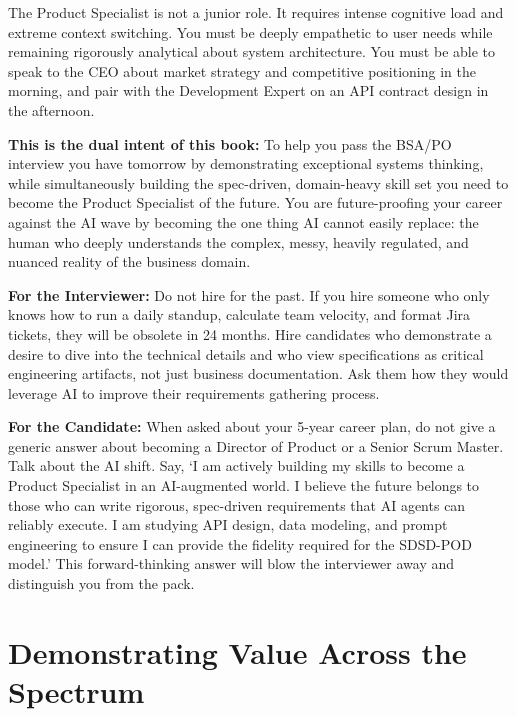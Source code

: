 \documentclass[
  11pt,
  openany,
  oneside]{book}
\renewenvironment{quote}{\begin{customquote}}{\end{customquote}}
\begin{document}
The Product Specialist is not a junior role. It requires intense
cognitive load and extreme context switching. You must be deeply
empathetic to user needs while remaining rigorously analytical about
system architecture. You must be able to speak to the CEO about market
strategy and competitive positioning in the morning, and pair with the
Development Expert on an API contract design in the afternoon.

\textbf{This is the dual intent of this book:} To help you pass the
BSA/PO interview you have tomorrow by demonstrating exceptional systems
thinking, while simultaneously building the spec-driven, domain-heavy
skill set you need to become the Product Specialist of the future. You
are future-proofing your career against the AI wave by becoming the one
thing AI cannot easily replace: the human who deeply understands the
complex, messy, heavily regulated, and nuanced reality of the business
domain.

\begin{quote}
\textbf{For the Interviewer:} Do not hire for the past. If you hire
someone who only knows how to run a daily standup, calculate team
velocity, and format Jira tickets, they will be obsolete in 24 months.
Hire candidates who demonstrate a desire to dive into the technical
details and who view specifications as critical engineering artifacts,
not just business documentation. Ask them how they would leverage AI to
improve their requirements gathering process.
\end{quote}

\begin{quote}
\textbf{For the Candidate:} When asked about your 5-year career plan, do
not give a generic answer about becoming a Director of Product or a
Senior Scrum Master. Talk about the AI shift. Say, `I am actively
building my skills to become a Product Specialist in an AI-augmented
world. I believe the future belongs to those who can write rigorous,
spec-driven requirements that AI agents can reliably execute. I am
studying API design, data modeling, and prompt engineering to ensure I
can provide the fidelity required for the SDSD-POD model.' This
forward-thinking answer will blow the interviewer away and distinguish
you from the pack.
\end{quote}

\section{Demonstrating Value Across the
Spectrum}\label{demonstrating-value-across-the-spectrum}
\end{document}
